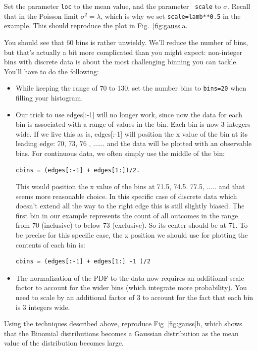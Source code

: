 \begin{plot} Set the parameter {\tt loc} to the mean value, and the parameter {\tt
  scale} to $\sigma$.  Recall that in the Poisson limit $\sigma^2 =
\lambda$, which is why we set {\tt scale=lamb**0.5} in the example.
This should reproduce the plot in Fig.~\ref{fig:gauss}a. \end{plot}

You should see that 60 bins is rather unwieldy.  We'll reduce the number
of bins, but that's actually a bit more complicated than you might
expect: non-integer bins with discrete data is about the most
challenging binning you can tackle.  You'll have to do the following:
\begin{itemize}
\item While keeping the range of 70 to 130, set the number bins to {\tt bins=20} when filling your histogram.
\item Our trick to use edges[:-1] will no longer work, since now the data for each bin is associated with a range of values in the bin.  Each bin is now 3 integers wide. If we live this as is, edges[:-1] will position the x value of the bin at its leading edge: 70, 73, 76 , ......  and the data will be plotted with an observable bias.  For continuous data, we often simply use the middle of the bin:
\begin{verbatim}
cbins = (edges[:-1] + edges[1:])/2.  
\end{verbatim}
This would position the x value of the bins at 71.5, 74.5. 77.5, ..... and that seems more reasonable choice. 
In this specific case of discrete data which doesn't extend  all the way to the right edge this is still slightly biased. The first bin in our example represents the count of all outcomes in the range from 70 (inclusive) to below 73 (exclusive). So its center should be at 71.  To be precise for this specific case, the x position we should use for plotting the contents of each bin is:
\begin{verbatim}
cbins = (edges[:-1] + edges[1:] -1 )/2 
\end{verbatim}
\item The normalization of the PDF to the data now requires an additional scale factor to account for the wider bins (which integrate more probability).  You need to scale by an additional factor of 3 to account for the fact that each bin is 3 integers wide.
\end{itemize}

\begin{plot} Using the techniques described above, reproduce Fig~\ref{fig:gauss}b, which shows that the Binomial distributions becomes a Gaussian distribution as the mean value of the distribution becomes large. \end{plot}

